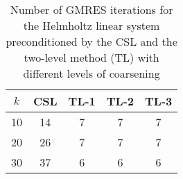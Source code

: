 \begin{table}[t]
\centering
\begin{tabular}{ccccc}
\hline
$k$ & CSL & TL-1 & TL-2 & TL-3 \\ \hline
10 & 14 & 7 & 7 & 7 \\
20 & 26 & 7 & 7 & 7 \\
30 & 37 & 6 & 6 & 6 \\
\hline
\end{tabular}
\caption{Number of GMRES iterations for the Helmholtz linear system preconditioned by the  CSL and the two-level method (TL) with different levels of coarsening}
\label{table:gmres_csl_vs_adef_coarse_eps_10}
\end{table}
